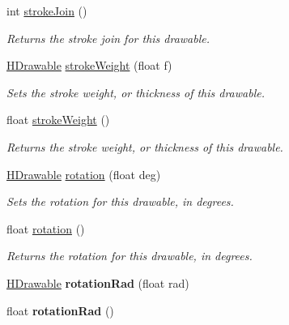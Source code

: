 \begin{DoxyCompactItemize}
int \hyperlink{classhype_1_1drawable_1_1_h_drawable_aa0f8402fa01dd4a77cb2f46fd869e290}{stroke\-Join} ()
\begin{DoxyCompactList}\small\item\em Returns the stroke join for this drawable. \end{DoxyCompactList}\item 
\hyperlink{classhype_1_1drawable_1_1_h_drawable}{H\-Drawable} \hyperlink{classhype_1_1drawable_1_1_h_drawable_a35e86b46f7a87e0caf41b005d9579bbb}{stroke\-Weight} (float f)
\begin{DoxyCompactList}\small\item\em Sets the stroke weight, or thickness of this drawable. \end{DoxyCompactList}\item 
float \hyperlink{classhype_1_1drawable_1_1_h_drawable_addcad70b22c1df45f52562394e4db624}{stroke\-Weight} ()
\begin{DoxyCompactList}\small\item\em Returns the stroke weight, or thickness of this drawable. \end{DoxyCompactList}\item 
\hyperlink{classhype_1_1drawable_1_1_h_drawable}{H\-Drawable} \hyperlink{classhype_1_1drawable_1_1_h_drawable_a65ca80c8327fd73cfb6c459d5fe03032}{rotation} (float deg)
\begin{DoxyCompactList}\small\item\em Sets the rotation for this drawable, in degrees. \end{DoxyCompactList}\item 
float \hyperlink{classhype_1_1drawable_1_1_h_drawable_a8eb40202a2ff44b5cf530240bd390be4}{rotation} ()
\begin{DoxyCompactList}\small\item\em Returns the rotation for this drawable, in degrees. \end{DoxyCompactList}\item 
\hypertarget{classhype_1_1drawable_1_1_h_drawable_a0e4d63f112b6904b084c2f8eca8757df}{\hyperlink{classhype_1_1drawable_1_1_h_drawable}{H\-Drawable} {\bfseries rotation\-Rad} (float rad)}\label{classhype_1_1drawable_1_1_h_drawable_a0e4d63f112b6904b084c2f8eca8757df}

\item 
\hypertarget{classhype_1_1drawable_1_1_h_drawable_a11f92096fcd9835477a861e7d60c9975}{float {\bfseries rotation\-Rad} ()}\label{classhype_1_1drawable_1_1_h_drawable_a11f92096fcd9835477a861e7d60c9975}


\end{DoxyCompactItemize}
